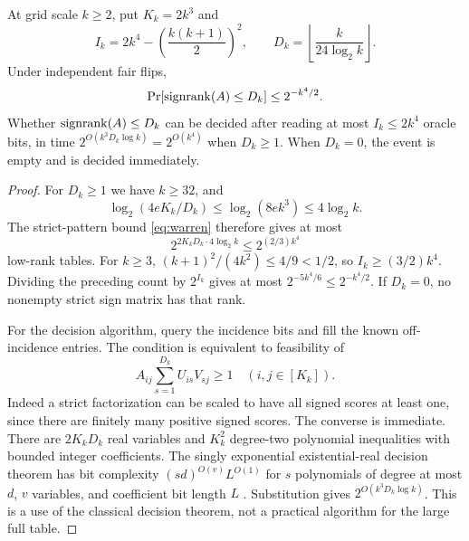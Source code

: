 \begin{samepage}
\begin{lemma}\label{lem:subgrid}
At grid scale $k\ge2$, put $K_k=2k^3$ and
\[
 I_k=2k^4-\left(\frac{k(k+1)}2\right)^2,
 \qquad D_k=\left\lfloor\frac{k}{24\log_2 k}\right\rfloor.
\]
Under independent fair flips,
\[
 \Pr[\operatorname{signrank}(A)\le D_k]\le2^{-k^4/2}.
\]
Whether $\operatorname{signrank}(A)\le D_k$ can be decided after reading at most $I_k\le2k^4$ oracle bits, in time $2^{O(k^3D_k\log k)}=2^{O(k^4)}$ when $D_k\ge1$. When $D_k=0$, the event is empty and is decided immediately.
\end{lemma}
\end{samepage}
\begin{proof}
For $D_k\ge1$ we have $k\ge32$, and
\[
 \log_2(4eK_k/D_k)\le\log_2(8e k^3)\le4\log_2k.
\]
The strict-pattern bound \eqref{eq:warren} therefore gives at most
\[
 2^{2K_kD_k\cdot4\log_2k}\le2^{(2/3)k^4}
\]
low-rank tables. For $k\ge3$, $(k+1)^2/(4k^2)\le4/9<1/2$, so $I_k\ge(3/2)k^4$. Dividing the preceding count by $2^{I_k}$ gives at most $2^{-5k^4/6}\le2^{-k^4/2}$. If $D_k=0$, no nonempty strict sign matrix has that rank.

For the decision algorithm, query the incidence bits and fill the known off-incidence entries. The condition is equivalent to feasibility of
\[
 A_{ij}\sum_{s=1}^{D_k}U_{is}V_{sj}\ge1\quad(i,j\in[K_k]).
\]
Indeed a strict factorization can be scaled to have all signed scores at least one, since there are finitely many positive signed scores. The converse is immediate. There are $2K_kD_k$ real variables and $K_k^2$ degree-two polynomial inequalities with bounded integer coefficients. The singly exponential existential-real decision theorem has bit complexity $(sd)^{O(v)}L^{O(1)}$ for $s$ polynomials of degree at most $d$, $v$ variables, and coefficient bit length $L$ \citep{Renegar92,Vorobjov21}. Substitution gives $2^{O(k^3D_k\log k)}$. This is a use of the classical decision theorem, not a practical algorithm for the large full table.
\end{proof}

